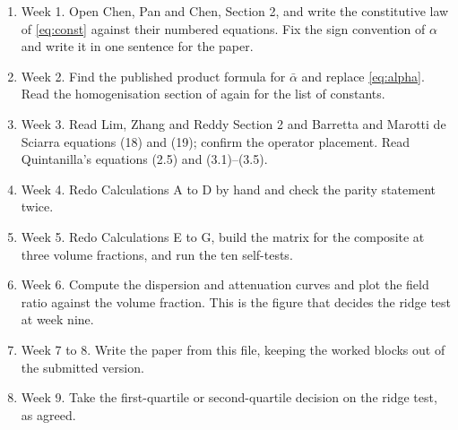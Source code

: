 \documentclass[11pt,a4paper]{article}
\newcommand{\aME}{\alpha}
\begin{document}
\begin{enumerate}
\item Week 1. Open Chen, Pan and Chen, Section 2, and write the constitutive law of \eqref{eq:const} against
their numbered equations. Fix the sign convention of $\aME$ and write it in one sentence for the paper.
\item Week 2. Find the published product formula for $\bar\aME$ and replace \eqref{eq:alpha}. Read the
homogenisation section of \cite{Tocci2021} again for the list of constants.
\item Week 3. Read Lim, Zhang and Reddy Section 2 and Barretta and Marotti de Sciarra equations (18) and
(19); confirm the operator placement. Read Quintanilla's equations (2.5) and (3.1)--(3.5).
\item Week 4. Redo Calculations A to D by hand and check the parity statement twice.
\item Week 5. Redo Calculations E to G, build the matrix for the composite at three volume fractions, and
run the ten self-tests.
\item Week 6. Compute the dispersion and attenuation curves and plot the field ratio against the volume
fraction. This is the figure that decides the ridge test at week nine.
\item Week 7 to 8. Write the paper from this file, keeping the worked blocks out of the submitted version.
\item Week 9. Take the first-quartile or second-quartile decision on the ridge test, as agreed.
\end{enumerate}



\end{document}
